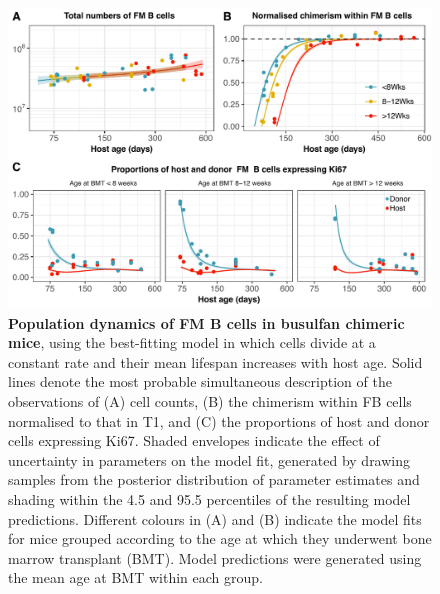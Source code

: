 \documentclass[12pt]{article}
\newcommand{\khi}{Ki67$^\text{hi}$}
\newcommand{\looic}{$\Delta$LOO-IC}
\begin{document}
 	\begin{figure}[htbp]
		\centerline{\includegraphics[scale = 0.85] {Results_FM_T1.pdf}}
		\caption{ \textbf{Population dynamics of FM B cells in busulfan chimeric mice}, using the best-fitting model in which cells divide at a constant rate and their mean lifespan increases with host age.
		Solid lines denote the most probable simultaneous description of the observations of (A) cell counts, (B) the  chimerism within FB cells normalised to that in T1,  and (C) the proportions of host and donor cells expressing Ki67. Shaded envelopes indicate the effect of uncertainty in parameters on the model fit, generated by drawing samples from the posterior distribution of parameter estimates and shading within the 4.5 and 95.5 percentiles of the resulting model predictions. Different colours in (A) and (B) indicate the model fits for mice grouped according to the age at which they underwent bone marrow transplant (BMT). Model predictions were generated using the mean age at BMT within each group.}
		\label{fig:results_FM}
	\end{figure}


 
\end{document}
